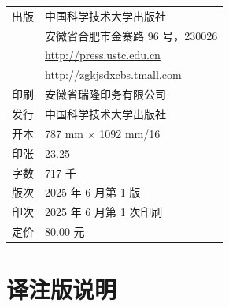 \medskip
\noindent
\begin{tabular}{@{}ll@{}}
出版 & 中国科学技术大学出版社\\
     & 安徽省合肥市金寨路 96 号，230026\\
     & \url{http://press.ustc.edu.cn}\\
     & \url{http://zgkjsdxcbs.tmall.com}\\
印刷 & 安徽省瑞隆印务有限公司\\
发行 & 中国科学技术大学出版社\\
开本 & 787 mm $\times$ 1092 mm\quad 1/16\\
印张 & 23.25\\
字数 & 717 千\\
版次 & 2025 年 6 月第 1 版\\
印次 & 2025 年 6 月第 1 次印刷\\
定价 & 80.00 元
\end{tabular}

\clearpage

\chapter*{译注版说明}

